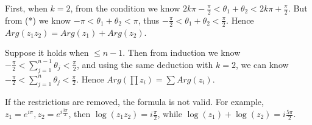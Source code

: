 \documentclass{article}%
\begin{document}
\begin{enumerate}
First, when $k = 2$, from the condition we know $2k\pi-\frac{\pi}{2} < \theta_1 + \theta_2 < 2k\pi+\frac{\pi}{2}$. But from (*) we know $-\pi < \theta_1 + \theta_2 <\pi $, thus $-\frac{\pi}{2} <\theta_1 + \theta_2 < \frac{\pi}{2}$. Hence $Arg(z_1z_2) = Arg(z_1)+Arg(z_2)$.

Suppose it holds when $\le n-1$. Then from induction we know $-\frac{\pi}{2} <\sum\limits_{j=1}^{n-1}\theta_j < \frac{\pi}{2}$, and using the same deduction with $k = 2$, we can know $-\frac{\pi}{2} <\sum\limits_{j=1}^{n}\theta_j < \frac{\pi}{2}$. Hence $Arg(\prod z_i) = \sum Arg(z_i)$.

If the restrictions are removed, the formula is not valid. For example, $z_1 = e^{i\pi}, z_2 = e^{i\frac{3\pi}{2}} $, then $\log(z_1z_2) = i\frac{\pi}{2}$, while $\log(z_1)+\log(z_2) = i\frac{5\pi}{2}$.

\end{enumerate}
\end{document}
